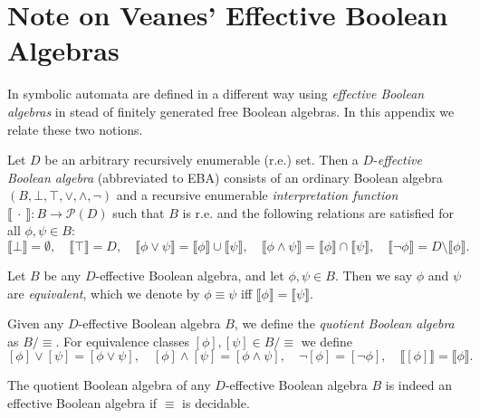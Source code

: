 
\section{Note on Veanes' Effective Boolean Algebras}
\label{sect-veanes}

In \cite{veanes} symbolic automata are defined in a different way using \emph{effective Boolean algebras} in stead of finitely generated free Boolean algebras. In this appendix we relate these two notions.

\begin{definition}
Let $D$ be an arbitrary recursively enumerable (r.e.) set. Then a $D$-\emph{effective Boolean algebra} (abbreviated to EBA) consists of an ordinary Boolean algebra $(B, \bot, \top, \vee, \wedge, \neg)$ and a recursive enumerable \emph{interpretation function} $\llbracket \ \cdot \ \rrbracket : B \rightarrow \mathcal{P}(D)$ such that $B$ is r.e. and the following relations are satisfied for all $\phi, \psi \in B$:
\[ \llbracket \bot \rrbracket = \emptyset, \quad \llbracket \top \rrbracket = D, \quad \llbracket \phi \vee \psi \rrbracket = \llbracket \phi \rrbracket \cup \llbracket \psi \rrbracket, \quad \llbracket \phi \wedge \psi \rrbracket = \llbracket \phi \rrbracket \cap \llbracket \psi \rrbracket, \quad \llbracket \neg \phi \rrbracket = D \setminus \llbracket \phi \rrbracket.\]
\end{definition}

\begin{definition}[Equivalence]
Let $B$ be any $D$-effective Boolean algebra, and let $\phi, \psi \in B$. Then we say $\phi$ and $\psi$ are \emph{equivalent}, which we denote by $\phi \equiv \psi$ iff $\llbracket \phi \rrbracket = \llbracket \psi \rrbracket$.
\end{definition}

\begin{definition}
Given any $D$-effective Boolean algebra $B$, we define the \emph{quotient Boolean algebra} as $B/{\equiv}$. For equivalence classes $[\phi], [\psi] \in B/{\equiv}$ we define
\[[\phi] \vee [\psi] = [\phi \vee \psi], \quad [\phi] \wedge [\psi] = [\phi \wedge \psi], \quad \neg [\phi] = [\neg \phi], \quad \llbracket [\phi ] \rrbracket = \llbracket \phi \rrbracket.\]
\end{definition}

\begin{proposition}
The quotient Boolean algebra of any $D$-effective Boolean algebra $B$ is indeed an effective Boolean algebra if $\equiv$ is decidable.
\end{proposition}

